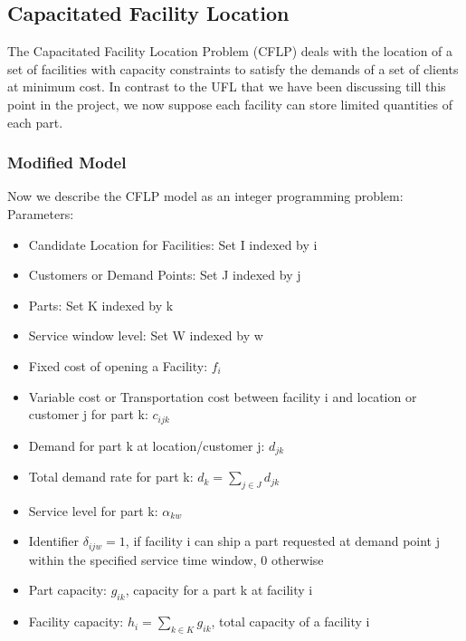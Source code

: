\documentclass[12pt]{article}
\numberwithin{equation}{section}
\begin{document}
\subsection{Capacitated Facility Location}
The Capacitated Facility Location Problem (CFLP) deals with the location of a set of facilities with capacity constraints to satisfy the demands of a set of clients at minimum cost. In contrast to the UFL that we have been discussing till this point in the project,  we now suppose each facility can store limited quantities of each part. 

\subsubsection{Modified Model}
Now we describe the CFLP model as an integer programming problem:\\
Parameters:
\begin{itemize}
\item 
Candidate Location for Facilities: Set I indexed by i
\item 
Customers or Demand Points: Set J indexed by j
\item 
Parts: Set K indexed by k
\item
Service window level: Set W indexed by w
\item 
Fixed cost of opening a Facility: $f_i$
\item 
Variable cost or Transportation cost between facility i and location or customer j for part k: $c_{ijk}$
\item 
Demand for part k at location/customer j: $d_{jk}$
\item
Total demand rate for part k: $d_{k} = \sum_{j\in J}d_{jk}$
\item
Service level for part k: $\alpha_{kw}$
\item
Identifier $\delta_{ijw} = 1$, if facility i can ship a part requested at demand point j within the specified service time window, 0 otherwise 
\item
Part capacity: $g_{ik}$, capacity for a part k at  facility i
\item
Facility capacity: $h_i = \sum_{k \in K}g_{ik}$, total capacity of a facility i
\end{itemize}
\end{document}
